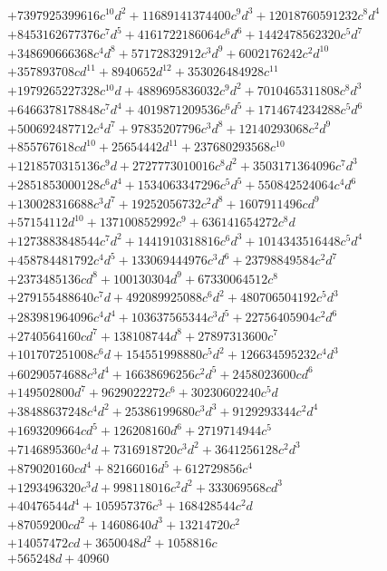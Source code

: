 {\begin{align*}
&+7397925399616c^{10}d^{2}+11689141374400c^{9}d^{3}+12018760591232c^{8}d^{4}\\
&+8453162677376c^{7}d^{5}+4161722186064c^{6}d^{6}+1442478562320c^{5}d^{7}\\
&+348690666368c^{4}d^{8}+57172832912c^{3}d^{9}+6002176242c^{2}d^{10}\\
&+357893708cd^{11}+8940652d^{12}+353026484928c^{11}\\
&+1979265227328c^{10}d+4889695836032c^{9}d^{2}+7010465311808c^{8}d^{3}\\
&+6466378178848c^{7}d^{4}+4019871209536c^{6}d^{5}+1714674234288c^{5}d^{6}\\
&+500692487712c^{4}d^{7}+97835207796c^{3}d^{8}+12140293068c^{2}d^{9}\\
&+855767618cd^{10}+25654442d^{11}+237680293568c^{10}\\
&+1218570315136c^{9}d+2727773010016c^{8}d^{2}+3503171364096c^{7}d^{3}\\
&+2851853000128c^{6}d^{4}+1534063347296c^{5}d^{5}+550842524064c^{4}d^{6}\\
&+130028316688c^{3}d^{7}+19252056732c^{2}d^{8}+1607911496cd^{9}\\
&+57154112d^{10}+137100852992c^{9}+636141654272c^{8}d\\
&+1273883848544c^{7}d^{2}+1441910318816c^{6}d^{3}+1014343516448c^{5}d^{4}\\
&+458784481792c^{4}d^{5}+133069444976c^{3}d^{6}+23798849584c^{2}d^{7}\\
&+2373485136cd^{8}+100130304d^{9}+67330064512c^{8}\\
&+279155488640c^{7}d+492089925088c^{6}d^{2}+480706504192c^{5}d^{3}\\
&+283981964096c^{4}d^{4}+103637565344c^{3}d^{5}+22756405904c^{2}d^{6}\\
&+2740564160cd^{7}+138108744d^{8}+27897313600c^{7}\\
&+101707251008c^{6}d+154551998880c^{5}d^{2}+126634595232c^{4}d^{3}\\
&+60290574688c^{3}d^{4}+16638696256c^{2}d^{5}+2458023600cd^{6}\\
&+149502800d^{7}+9629022272c^{6}+30230602240c^{5}d\\
&+38488637248c^{4}d^{2}+25386199680c^{3}d^{3}+9129293344c^{2}d^{4}\\
&+1693209664cd^{5}+126208160d^{6}+2719714944c^{5}\\
&+7146895360c^{4}d+7316918720c^{3}d^{2}+3641256128c^{2}d^{3}\\
&+879020160cd^{4}+82166016d^{5}+612729856c^{4}\\
&+1293496320c^{3}d+998118016c^{2}d^{2}+333069568cd^{3}\\
&+40476544d^{4}+105957376c^{3}+168428544c^{2}d\\
&+87059200cd^{2}+14608640d^{3}+13214720c^{2}\\
&+14057472cd+3650048d^{2}+1058816c\\
&+565248d+40960
\end{align*}
}

